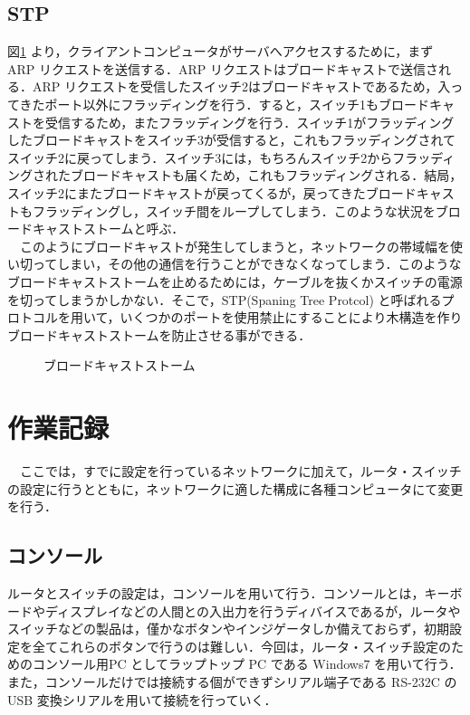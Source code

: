 \documentclass[a4j,titlepage]{jarticle}
\begin{document}
  \subsection{STP}
図\ref{fig:stp} より，クライアントコンピュータがサーバへアクセスするために，まず ARP リクエストを送信する．ARP リクエストはブロードキャストで送信される．ARP リクエストを受信したスイッチ2はブロードキャストであるため，入ってきたポート以外にフラッディングを行う．すると，スイッチ1もブロードキャストを受信するため，またフラッディングを行う．スイッチ1がフラッディングしたブロードキャストをスイッチ3が受信すると，これもフラッディングされてスイッチ2に戻ってしまう．スイッチ3には，もちろんスイッチ2からフラッディングされたブロードキャストも届くため，これもフラッディングされる．結局，スイッチ2にまたブロードキャストが戻ってくるが，戻ってきたブロードキャストもフラッディングし，スイッチ間をループしてしまう．このような状況をブロードキャストストームと呼ぶ．\\
　このようにブロードキャストが発生してしまうと，ネットワークの帯域幅を使い切ってしまい，その他の通信を行うことができなくなってしまう．このようなブロードキャストストームを止めるためには，ケーブルを抜くかスイッチの電源を切ってしまうかしかない\cite{bib:network}．そこで，STP(Spaning Tree Protcol) と呼ばれるプロトコルを用いて，いくつかのポートを使用禁止にすることにより木構造を作りブロードキャストストームを防止させる事ができる．


  \begin{figure}[htbp]
    \begin{center}
      \caption{ブロードキャストストーム\cite{bib:network}}
     \label{fig:stp}
   \end{center}
  \end{figure}
  

\section{作業記録}
　ここでは，すでに設定を行っているネットワークに加えて，ルータ・スイッチの設定に行うとともに，ネットワークに適した構成に各種コンピュータにて変更を行う．

\subsection{コンソール}
ルータとスイッチの設定は，コンソールを用いて行う．コンソールとは，キーボードやディスプレイなどの人間との入出力を行うディバイスであるが，ルータやスイッチなどの製品は，僅かなボタンやインジゲータしか備えておらず，初期設定を全てこれらのボタンで行うのは難しい．今回は，ルータ・スイッチ設定のためのコンソール用PC としてラップトップ PC である Windows7 を用いて行う．また，コンソールだけでは接続する個ができずシリアル端子である RS-232C の USB 変換シリアルを用いて接続を行っていく．
\end{document}
